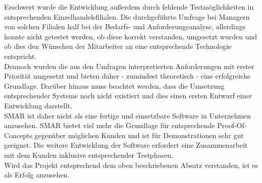Erschwert wurde die Entwicklung außerdem durch fehlende Testmöglichkeiten in entsprechenden Einzelhandelsfilialen. Die durchgeführte Umfrage bei Managern von solchen Filialen half bei der Bedarfs- und Anforderungsanalyse, allerdings konnte nicht getestet werden, ob diese korrekt verstanden, umgesetzt wurden und ob dies den Wünschen der Mitarbeiter an eine entsprechende Technologie entspricht.\\

Dennoch wurden die aus den Umfragen interpretierten Anforderungen mit erster Priorität umgesetzt und bieten daher - zumindest theoretisch - eine erfolgreiche Grundlage. Darüber hinaus muss beachtet werden, dass die Umsetzung entsprechender Systeme noch nicht existiert und dies einen ersten Entwurf einer Entwicklung darstellt.\\

\ac{SMAR} ist daher nicht als eine fertige und einsetzbare Software in Unternehmen anzusehen. \ac{SMAR} bietet viel mehr die Grundlage für entsprechende Proof-Of-Concepts gegenüber möglichen Kunden und ist für Demonstrationen sehr gut geeignet. Die weitere Entwicklung der Software erfordert eine Zusammenarbeit mit dem Kunden inklusive entsprechender Testphasen.\\

Wird das Projekt entsprechend dem oben beschriebenen Absatz verstanden, ist es als Erfolg anzusehen.